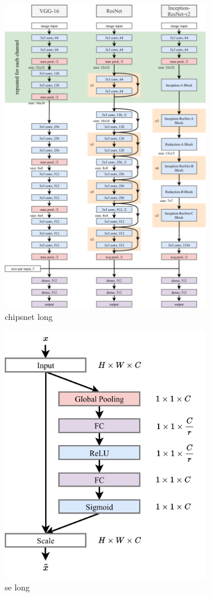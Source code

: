 \begin{figure}
    \includegraphics[width=0.8\textwidth]{diagrams/6-cvn/chipsnet.pdf}
    \caption[chipsnet short]
    {chipsnet long}
    \label{fig:chipsnet}
\end{figure}

\begin{figure}
    \includegraphics[width=0.8\textwidth]{diagrams/6-cvn/se.pdf}
    \caption[se short]
    {se long}
    \label{fig:se}
\end{figure}

